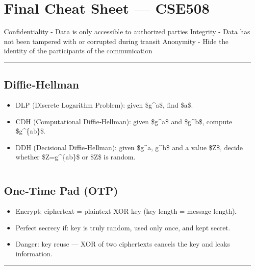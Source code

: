 \documentclass{article}
\begin{document}
\section{Final Cheat Sheet — CSE508}

Confidentiality - Data is only accessible to authorized parties
Integrity - Data has not been tampered with or corrupted during transit
Anonymity - Hide the identity of the participants of the communication

\hrule

\subsection{Diffie‑Hellman}
\begin{itemize}
  \item DLP (Discrete Logarithm Problem): given \$g^a\$, find \$a\$.
  \item CDH (Computational Diffie‑Hellman): given \$g^a\$ and \$g^b\$, compute \$g^\{ab\}\$.
  \item DDH (Decisional Diffie‑Hellman): given \$g^a, g^b\$ and a value \$Z\$, decide whether \$Z=g^\{ab\}\$ or \$Z\$ is random.
\end{itemize}

\hrule

\subsection{One‑Time Pad (OTP)}
\begin{itemize}
  \item Encrypt: ciphertext = plaintext XOR key (key length = message length).
  \item Perfect secrecy if: key is truly random, used only once, and kept secret.
  \item Danger: key reuse — XOR of two ciphertexts cancels the key and leaks information.
\end{itemize}

\hrule
\end{document}

